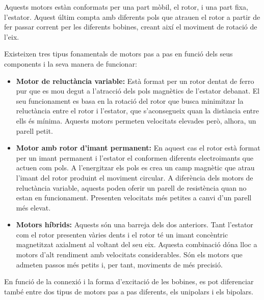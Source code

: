 Aquests motors estàn conformats per una part mòbil, el rotor, i una part fixa, l'estator. Aquest últim compta amb diferents pols que atrauen el rotor a partir de fer passar corrent per les diferents bobines, creant així el moviment de rotació de l'eix.

Existeixen tres tipus fonamentals de motors pas a pas en funció dels seus components i la seva manera de funcionar:

\begin{itemize}
	\item \textbf{Motor de reluctància variable:} Està format per un rotor dentat de ferro pur que es mou degut a l'atracció dels pols magnètics de l'estator debanat. El seu funcionament es basa en la rotació del rotor que busca minimitzar la reluctància entre el rotor i l'estator, que s'aconsegueix quan la distància entre ells és mínima. Aquests motors permeten velocitats elevades però, alhora, un parell petit. 
	
	\item \textbf{Motor amb rotor d'imant permanent:} En aquest cas el rotor està format per un imant permanent i l'estator el conformen diferents electroimants que actuen com pols. A l'energitzar els pols es crea un camp magnètic que atrau l'imant del rotor produint el moviment circular. A diferència dels motors de reluctància variable, aquests poden oferir un parell de resistència quan no estan en funcionament. Presenten velocitats més petites a canvi d'un parell més elevat. 
	
	\item \textbf{Motors híbrids:} Aquests són una barreja dels dos anteriors. Tant l'estator com el rotor presenten vàries dents i el rotor té un imant concèntric magnetitzat axialment al voltant del seu eix. Aquesta combinació dóna lloc a motors d'alt rendiment amb velocitats considerables. Són els motors que admeten passos més petits i, per tant, moviments de més precisió. 
\end{itemize}
En funció de la connexió i la forma d'excitació de les  bobines, es pot diferenciar també entre dos tipus de motors pas a pas diferents, els unipolars i els bipolars.

